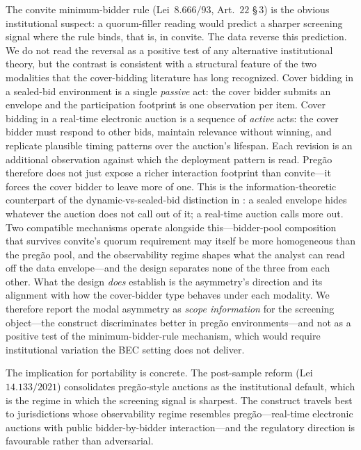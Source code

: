 The convite minimum-bidder rule
(Lei~$8.666/93$, Art.~$22$ \S\,$3$) is the obvious institutional
suspect: a quorum-filler reading would predict a sharper
screening signal where the rule binds, that is, in convite. The
data reverse this prediction. We do not read the reversal as a
positive test of any alternative institutional theory, but the
contrast is consistent with a structural feature of the two
modalities that the cover-bidding literature has long
recognized. Cover bidding in a sealed-bid environment is a
single \emph{passive} act: the cover bidder submits an envelope
and the participation footprint is one observation per item.
Cover bidding in a real-time electronic auction is a sequence
of \emph{active} acts: the cover bidder must respond to other
bids, maintain relevance without winning, and replicate
plausible timing patterns over the auction's lifespan. Each
revision is an additional observation against which the
deployment pattern is read. Pregão therefore does not just
expose a richer interaction footprint than convite---it forces
the cover bidder to leave more of one. This is the
information-theoretic counterpart of the dynamic-vs-sealed-bid
distinction in
\citet{marshall2012economics,asker2010leniency,athey2011comparing}:
a sealed envelope hides whatever the auction does not call out
of it; a real-time auction calls more out. Two compatible
mechanisms operate alongside this---bidder-pool composition
that survives convite's quorum requirement may itself be more
homogeneous than the pregão pool, and the observability regime
shapes what the analyst can read off the data envelope---and
the design separates none of the three from each other. What
the design \emph{does} establish is the asymmetry's direction
and its alignment with how the cover-bidder type behaves under
each modality. We therefore report the modal asymmetry as
\emph{scope information} for the screening object---the
construct discriminates better in pregão environments---and
not as a positive test of the minimum-bidder-rule mechanism,
which would require institutional variation the BEC setting
does not deliver.

The implication for portability is concrete. The post-sample
reform (Lei~$14.133/2021$) consolidates pregão-style auctions as
the institutional default, which is the regime in which the
screening signal is sharpest. The construct travels best to
jurisdictions whose observability regime resembles
pregão---real-time electronic auctions with public
bidder-by-bidder interaction---and the regulatory direction is
favourable rather than adversarial.
